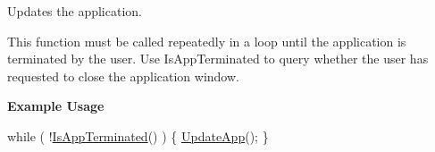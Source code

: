 Updates the application.

This function must be called repeatedly in a loop until the application is terminated by the user. Use Is\+App\+Terminated to query whether the user has requested to close the application window.

{\bfseries Example Usage}


\begin{DoxyCode}
\textcolor{keywordflow}{while} ( !\hyperlink{group__sdl__group_ga6d29aa641d22a0299da4710022c8c96b}{IsAppTerminated}() ) \{
  \hyperlink{group__sdl__group_ga9bf9bfe01e7d336c3a3b13cc923ff850}{UpdateApp}();
\}
\end{DoxyCode}
 
